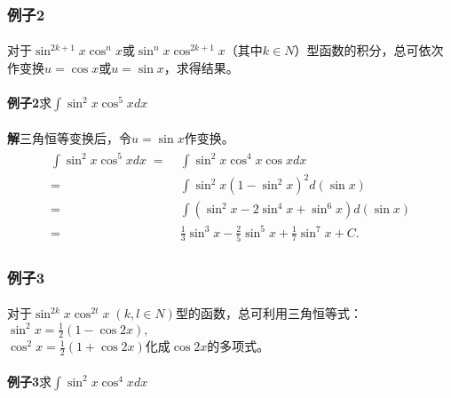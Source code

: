 \subsubsection{例子2}
\paragraph{}
对于$\sin^{2k+1}x\cos^nx$或$\sin^nx\cos^{2k+1}x$（其中$k\in N$）型函数的积分，总可依次作变换$u=\cos{x}$或$u=\sin{x}$，求得结果。

\paragraph{}
\textbf{例子2\;}求$\displaystyle\int{\sin^2x\cos^5xdx}$

\paragraph{}
\textbf{解\;}三角恒等变换后，令$u=\sin{x}$作变换。
\begin{align*}
\begin{split}
  \int\sin^2x\cos^5xdx \;=&\; \int\sin^2x\cos^4x\cos{x}dx \\
    =&\; \int\sin^2x(1-\sin^2x)^2d(\sin{x})  \\
    =&\; \int(\sin^2x-2\sin^4x + \sin^6x)d(\sin{x}) \\
    =&\; \frac{1}{3}\sin^3x-\frac{2}{5}\sin^5x+\frac{1}{7}\sin^7x + C.
\end{split}
\end{align*}

\subsubsection{例子3}
\label{第一类换元法例子3}
\paragraph{}
对于$\sin^{2k}x\cos^{2t}x \; (k,l \in N)$型的函数，总可利用三角恒等式：$\displaystyle\sin^2x=\frac{1}{2}(1-\cos{2x}),$ \\ $ \cos^2x = \frac{1}{2}(1+\cos{2x})$化成$\cos{2x}$的多项式。

\paragraph{}
\textbf{例子3\;}求$\displaystyle\int\sin^2x\cos^4xdx$

